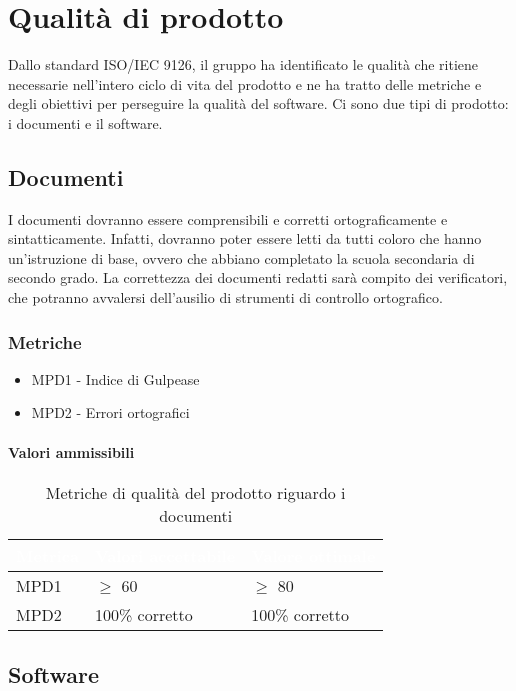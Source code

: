 \section{Qualità di prodotto}
Dallo standard ISO/IEC 9126, il gruppo \Gruppo{} ha identificato le qualità che ritiene necessarie nell'intero ciclo di vita del prodotto e ne ha tratto delle metriche e degli obiettivi per perseguire la qualità del software. Ci sono due tipi di prodotto: i documenti e il software.

\subsection{Documenti}
I documenti dovranno essere comprensibili e corretti ortograficamente e sintatticamente. Infatti, dovranno poter essere letti da tutti coloro che hanno un'istruzione di base, ovvero che abbiano completato la scuola secondaria di secondo grado. La correttezza dei documenti redatti sarà compito dei verificatori, che potranno avvalersi dell'ausilio di strumenti di controllo ortografico. 

\subsubsection{Metriche}
\begin{itemize}
\item MPD1 - Indice di Gulpease
\item MPD2 - Errori ortografici
\end{itemize} 
\paragraph{Valori ammissibili}
\renewcommand{\arraystretch}{1.5}
\begin{longtable}{C{2.5cm} C{4cm} C{4cm}}
\textcolor{white}{\textbf{Metrica}}&
\textcolor{white}{\textbf{Valori accettabile}}&
\textcolor{white}{\textbf{Valore ottimale}}\\	
\endhead
\endfoot
{}\caption{Metriche di qualità del prodotto riguardo i documenti}
\endlastfoot
		MPD1 &  
		$\geq$ 60 & 
		$\geq$ 80\\
		MPD2 & 
		100\% corretto & 
		100\% corretto \\
\end{longtable}
\subsection{Software}
